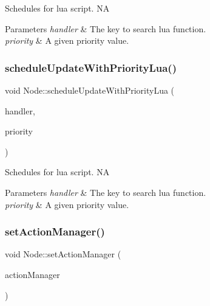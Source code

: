 Schedules for lua script.  NA


\begin{DoxyParams}{Parameters}
{\em handler} & The key to search lua function. \\
\hline
{\em priority} & A given priority value. \\
\hline
\end{DoxyParams}
\mbox{\label{classNode_a0fc543c82cc9b139cfb57f65eb770fb0}} 
\subsubsection{\texorpdfstring{schedule\+Update\+With\+Priority\+Lua()}{scheduleUpdateWithPriorityLua()}\hspace{0.1cm}{\footnotesize\ttfamily [2/2]}}
{\footnotesize\ttfamily void Node\+::schedule\+Update\+With\+Priority\+Lua (\begin{DoxyParamCaption}\item[{int}]{handler,  }\item[{int}]{priority }\end{DoxyParamCaption})}

Schedules for lua script.  NA


\begin{DoxyParams}{Parameters}
{\em handler} & The key to search lua function. \\
\hline
{\em priority} & A given priority value. \\
\hline
\end{DoxyParams}
\mbox{\label{classNode_a2807ac202214bee721a75c098da54bc6}} 
\subsubsection{\texorpdfstring{set\+Action\+Manager()}{setActionManager()}\hspace{0.1cm}{\footnotesize\ttfamily [1/2]}}
{\footnotesize\ttfamily void Node\+::set\+Action\+Manager (\begin{DoxyParamCaption}\item[{\hyperlink{classActionManager}{Action\+Manager} $\ast$}]{action\+Manager }\end{DoxyParamCaption})\hspace{0.3cm}{\ttfamily [virtual]}}

